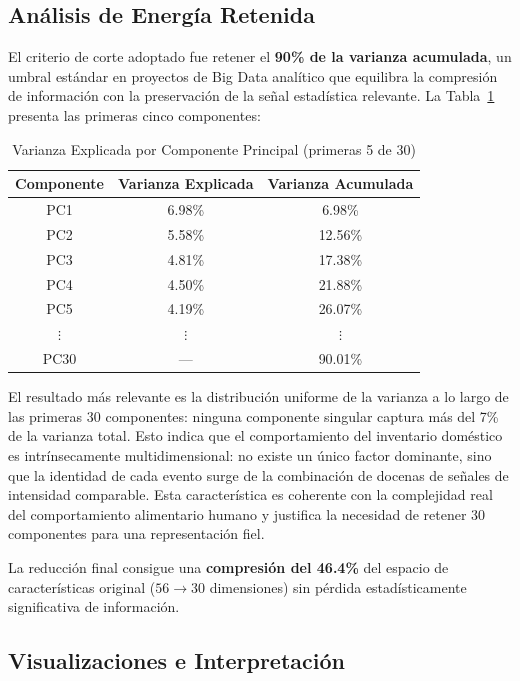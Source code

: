 \documentclass[12pt,a4paper]{article}
\begin{document}
\subsection{Análisis de Energía Retenida}

El criterio de corte adoptado fue retener el \textbf{90\% de la varianza acumulada}, un umbral estándar en proyectos de Big Data analítico que equilibra la compresión de información con la preservación de la señal estadística relevante. La Tabla~\ref{tab:pca_variance} presenta las primeras cinco componentes:

\begin{table}[H]
\centering
\caption{Varianza Explicada por Componente Principal (primeras 5 de 30)}
\label{tab:pca_variance}
\begin{tabular}{@{}ccc@{}}
\toprule
\textbf{Componente} & \textbf{Varianza Explicada} & \textbf{Varianza Acumulada} \\
\midrule
PC1  & 6.98\% & 6.98\%  \\
PC2  & 5.58\% & 12.56\% \\
PC3  & 4.81\% & 17.38\% \\
PC4  & 4.50\% & 21.88\% \\
PC5  & 4.19\% & 26.07\% \\
$\vdots$ & $\vdots$ & $\vdots$ \\
PC30 & --- & 90.01\% \\
\bottomrule
\end{tabular}
\end{table}

El resultado más relevante es la distribución uniforme de la varianza a lo largo de las primeras 30 componentes: ninguna componente singular captura más del 7\% de la varianza total. Esto indica que el comportamiento del inventario doméstico es intrínsecamente multidimensional: no existe un único factor dominante, sino que la identidad de cada evento surge de la combinación de docenas de señales de intensidad comparable. Esta característica es coherente con la complejidad real del comportamiento alimentario humano y justifica la necesidad de retener 30 componentes para una representación fiel.

La reducción final consigue una \textbf{compresión del 46.4\%} del espacio de características original ($56 \rightarrow 30$ dimensiones) sin pérdida estadísticamente significativa de información.

\subsection{Visualizaciones e Interpretación}
\end{document}
